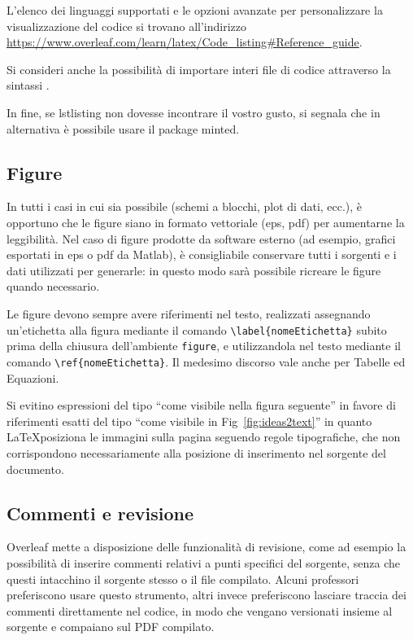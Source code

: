 L'elenco dei linguaggi supportati e le opzioni avanzate per personalizzare la visualizzazione del codice si trovano all'indirizzo \url{https://www.overleaf.com/learn/latex/Code_listing#Reference_guide}.

Si consideri anche la possibilità di importare interi file di codice attraverso la sintassi \verb||.

In fine, se lstlisting non dovesse incontrare il vostro gusto, si segnala che in alternativa è possibile usare il package minted.

\subsection{Figure}

In tutti i casi in cui sia possibile (schemi a blocchi, plot di dati, ecc.), \`e opportuno che le figure siano in formato vettoriale (eps, pdf) per aumentarne la leggibilit\`a.
Nel caso di figure prodotte da software esterno (ad esempio, grafici esportati in eps o pdf da Matlab), \`e consigliabile conservare tutti i sorgenti e i dati utilizzati per generarle: in questo modo sarà possibile ricreare le figure quando necessario.

Le figure devono sempre avere riferimenti nel testo, realizzati assegnando un'etichetta alla figura mediante il comando \verb|\label{nomeEtichetta}| subito prima della chiusura dell'ambiente \verb|figure|, e utilizzandola nel testo mediante il comando \verb|\ref{nomeEtichetta}|. Il medesimo discorso vale anche per Tabelle ed Equazioni.

Si evitino espressioni del tipo ``come visibile nella figura seguente'' in favore di riferimenti esatti del tipo ``come visibile in Fig~\ref{fig:ideas2text}'' in quanto \LaTeX posiziona le immagini sulla pagina seguendo regole tipografiche, che non corrispondono necessariamente alla posizione di inserimento nel sorgente del documento.

\subsection{Commenti e revisione}

Overleaf mette a disposizione delle funzionalità di revisione, come ad esempio la possibilità di inserire commenti relativi a punti specifici del sorgente, senza che questi intacchino il sorgente stesso o il file compilato. Alcuni professori preferiscono usare questo strumento, altri invece preferiscono lasciare traccia dei commenti direttamente nel codice, in modo che vengano versionati insieme al sorgente e compaiano sul PDF compilato.

